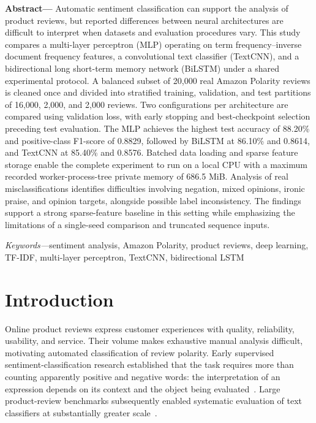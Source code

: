 \noindent\textbf{Abstract---}
Automatic sentiment classification can support the analysis of product reviews, but reported differences between neural architectures are difficult to interpret when datasets and evaluation procedures vary. This study compares a multi-layer perceptron (MLP) operating on term frequency--inverse document frequency features, a convolutional text classifier (TextCNN), and a bidirectional long short-term memory network (BiLSTM) under a shared experimental protocol. A balanced subset of 20,000 real Amazon Polarity reviews is cleaned once and divided into stratified training, validation, and test partitions of 16,000, 2,000, and 2,000 reviews. Two configurations per architecture are compared using validation loss, with early stopping and best-checkpoint selection preceding test evaluation. The MLP achieves the highest test accuracy of 88.20\% and positive-class F1-score of 0.8829, followed by BiLSTM at 86.10\% and 0.8614, and TextCNN at 85.40\% and 0.8576. Batched data loading and sparse feature storage enable the complete experiment to run on a local CPU with a maximum recorded worker-process-tree private memory of 686.5 MiB. Analysis of real misclassifications identifies difficulties involving negation, mixed opinions, ironic praise, and opinion targets, alongside possible label inconsistency. The findings support a strong sparse-feature baseline in this setting while emphasizing the limitations of a single-seed comparison and truncated sequence inputs.

\par\vspace{4pt}
{\raggedright\noindent\textit{Keywords---}sentiment analysis, Amazon Polarity, product reviews, deep learning, TF-IDF, multi-layer perceptron, TextCNN, bidirectional LSTM\par}

\section{Introduction}
Online product reviews express customer experiences with quality, reliability, usability, and service. Their volume makes exhaustive manual analysis difficult, motivating automated classification of review polarity. Early supervised sentiment-classification research established that the task requires more than counting apparently positive and negative words: the interpretation of an expression depends on its context and the object being evaluated~\cite{pang2002}. Large product-review benchmarks subsequently enabled systematic evaluation of text classifiers at substantially greater scale~\cite{zhang2015}.

